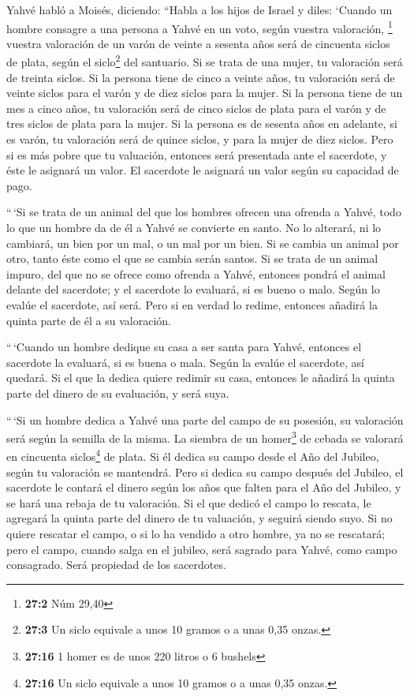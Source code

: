 \begin{paracol}{2}
 Yahvé habló a Moisés, diciendo:  ``Habla a
los hijos de Israel y diles: `Cuando un hombre consagre a una persona a
Yahvé en un voto, según vuestra valoración, \footnote{\textbf{27:2} Núm
  29,40}  vuestra valoración de un varón de veinte a
sesenta años será de cincuenta siclos de plata, según el
siclo\footnote{\textbf{27:3} Un siclo equivale a unos 10 gramos o a unas
  0,35 onzas.} del santuario.  Si se trata de una mujer,
tu valoración será de treinta siclos.  Si la persona tiene
de cinco a veinte años, tu valoración será de veinte siclos para el
varón y de diez siclos para la mujer.  Si la persona tiene
de un mes a cinco años, tu valoración será de cinco siclos de plata para
el varón y de tres siclos de plata para la mujer.  Si la
persona es de sesenta años en adelante, si es varón, tu valoración será
de quince siclos, y para la mujer de diez siclos.  Pero si
es más pobre que tu valuación, entonces será presentada ante el
sacerdote, y éste le asignará un valor. El sacerdote le asignará un
valor según su capacidad de pago.

 ``\,`Si se trata de un animal del que los hombres ofrecen
una ofrenda a Yahvé, todo lo que un hombre da de él a Yahvé se convierte
en santo.  No lo alterará, ni lo cambiará, un bien por un
mal, o un mal por un bien. Si se cambia un animal por otro, tanto éste
como el que se cambia serán santos.  Si se trata de un
animal impuro, del que no se ofrece como ofrenda a Yahvé, entonces
pondrá el animal delante del sacerdote;  y el sacerdote
lo evaluará, si es bueno o malo. Según lo evalúe el sacerdote, así será.
 Pero si en verdad lo redime, entonces añadirá la quinta
parte de él a su valoración.

 ``\,`Cuando un hombre dedique su casa a ser santa para
Yahvé, entonces el sacerdote la evaluará, si es buena o mala. Según la
evalúe el sacerdote, así quedará.  Si el que la dedica
quiere redimir su casa, entonces le añadirá la quinta parte del dinero
de su evaluación, y será suya.

 ``\,`Si un hombre dedica a Yahvé una parte del campo de
su posesión, su valoración será según la semilla de la misma. La siembra
de un homer\footnote{\textbf{27:16} 1 homer es de unos 220 litros o 6
  bushels} de cebada se valorará en cincuenta siclos\footnote{\textbf{27:16}
  Un siclo equivale a unos 10 gramos o a unas 0,35 onzas.} de plata.
 Si él dedica su campo desde el Año del Jubileo, según tu
valoración se mantendrá.  Pero si dedica su campo después
del Jubileo, el sacerdote le contará el dinero según los años que falten
para el Año del Jubileo, y se hará una rebaja de tu valoración.
 Si el que dedicó el campo lo rescata, le agregará la
quinta parte del dinero de tu valuación, y seguirá siendo suyo.
 Si no quiere rescatar el campo, o si lo ha vendido a
otro hombre, ya no se rescatará;  pero el campo, cuando
salga en el jubileo, será sagrado para Yahvé, como campo consagrado.
Será propiedad de los sacerdotes.


\end{paracol}
